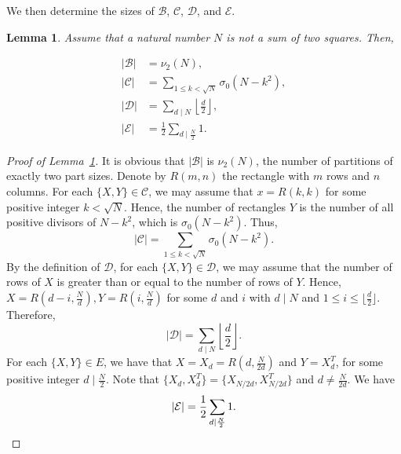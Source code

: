 \documentclass[a4paper,oneside,reqno]{amsart}
\theoremstyle{plain}
\newtheorem{lemma}[theorem]{Lemma}
\theoremstyle{definition}
\theoremstyle{remark}
\newcommand{\B}{\mathcal{B}}
\newcommand{\C}{\mathcal{C}}
\newcommand{\D}{\mathcal{D}}
\newcommand{\E}{\mathcal{E}}
\begin{document}
        
        We then determine the sizes of $\mathcal{B}$, $\mathcal{C}$, $\mathcal{D}$, and $\mathcal{E}$.
		

        \begin{lemma}
        \label{sizeBCDE}
            Assume that a natural number $N$ is not a sum of two squares. Then, 

            \begin{align*}
			|\mathcal{B}| &= \nu_2(N), \\
			|\mathcal{C}| &= \sum_{1 \leq k < \sqrt{N}} \sigma_0(N - k^2), \\
			|\mathcal{D}| &= \sum_{d \mid N} \left\lfloor \frac{d}{2} \right\rfloor, \\
			|\mathcal{E}| &= \frac{1}{2} \sum_{d \mid \frac{N}{2}} 1. 
		\end{align*}
        
        \end{lemma}
		
		\begin{proof}[Proof of Lemma~\ref{sizeBCDE}] 
            It is obvious that $|\B|$ is $\nu_2(N)$, the number of partitions of exactly two part sizes. Denote by $R(m,n)$ the rectangle with $m$ rows and $n$ columns. For each $\{X,Y\} \in \C$, we may assume that $x = R(k,k)$ for some positive integer $k < \sqrt{N}$. Hence, the number of rectangles $Y$ is the number of all positive divisors of $N - k^2$, which is $\sigma_0(N-k^2)$. Thus, 
            \[
            |\C| = \sum_{1 \leq k < \sqrt{N}} \sigma_0(N - k^2). 
            \]
            By the definition of $\D$, for each $\{X,Y\} \in \D$, we may assume that the number of rows of $X$ is greater than or equal to the number of rows of $Y$. Hence, $X = R(d-i, \frac{N}{d}), Y = R(i, \frac{N}{d})$ for some $d$ and $i$ with $d \mid N$ and $1 \leq i \leq \lfloor \frac{d}{2} \rfloor$. Therefore, 
            \[
            |\D| = \sum_{d \mid N} \left\lfloor \frac{d}{2} \right\rfloor. 
            \]
            For each $\{X,Y\} \in E$, we have that $X = X_d = R(d, \frac{N}{2d})$ and $Y = X_d^T$, for some positive integer $d \mid \frac{N}{2}$. Note that $\{X_d,X_d^T\} = \{X_{N/2d},X_{N/2d}^T\}$ and $d \neq \frac{N}{2d}$. We have 
            \[
            |\E| = \frac{1}{2}\sum_{d \mid \frac{N}{2}} 1. \qedhere
            \]
        \end{proof}
\end{document}
